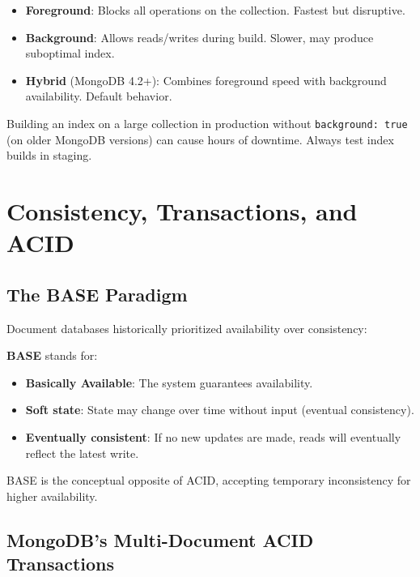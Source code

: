 \documentclass[12pt,a4paper]{article}
\begin{document}
\begin{itemize}[noitemsep]
    \item \textbf{Foreground}: Blocks all operations on the collection. Fastest but disruptive.
    \item \textbf{Background}: Allows reads/writes during build. Slower, may produce suboptimal index.
    \item \textbf{Hybrid} (MongoDB 4.2+): Combines foreground speed with background availability. Default behavior.
\end{itemize}

\begin{warning}
Building an index on a large collection in production without \texttt{background: true} (on older MongoDB versions) can cause hours of downtime. Always test index builds in staging.
\end{warning}

\section{Consistency, Transactions, and ACID}

\subsection{The BASE Paradigm}

Document databases historically prioritized availability over consistency:

\begin{definition}
\textbf{BASE} stands for:
\begin{itemize}[noitemsep]
    \item \textbf{Basically Available}: The system guarantees availability.
    \item \textbf{Soft state}: State may change over time without input (eventual consistency).
    \item \textbf{Eventually consistent}: If no new updates are made, reads will eventually reflect the latest write.
\end{itemize}
BASE is the conceptual opposite of ACID, accepting temporary inconsistency for higher availability.
\end{definition}

\subsection{MongoDB's Multi-Document ACID Transactions}
\end{document}
